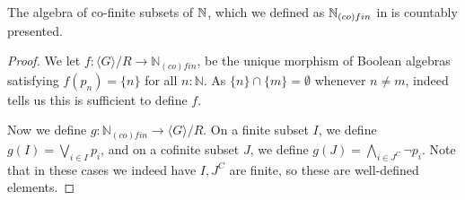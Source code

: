 \begin{remark}\label{N-co-fin-cp}
  The algebra of co-finite subsets of $\mathbb{N}$, which we defined as $\mathbb{N}_{(co)fin}$ in  is
  countably presented.
\end{remark}
\begin{proof}
  We let $f:\langle G \rangle / R \to \mathbb N_{(co)fin}$, be the unique morphism of Boolean algebras 
  satisfying $f(p_n) = \{n\}$ for all $n:\mathbb N$. As $\{n\} \cap \{m\} = \emptyset$ whenever $n\neq m$, 
   indeed tells us this is sufficient to define $f$. 

  Now we define $g:\mathbb N_{(co)fin} \to \langle G \rangle / R$. 
  On a finite subset $I$, we define $g(I) = \bigvee_{i\in I} p_i$, 
  and on a cofinite subset $J$, we define $g(J) = \bigwedge _{i \in J^C} \neg p_i$. 
  Note that in these cases we indeed have $I,J^C$ are finite, so these are well-defined elements. 


\end{proof}
